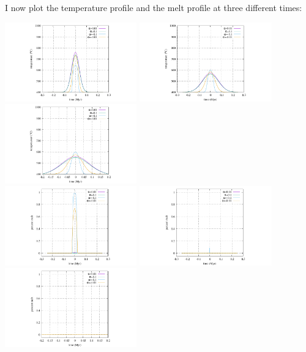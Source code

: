 I now plot the temperature profile and the melt profile at three different times:
\begin{center}
\includegraphics[width=5.7cm]{python_codes/fieldstone_169/results/nonlinear/T_10000.pdf}
\includegraphics[width=5.7cm]{python_codes/fieldstone_169/results/nonlinear/T_50000.pdf}
\includegraphics[width=5.7cm]{python_codes/fieldstone_169/results/nonlinear/T_100000.pdf}\\
\includegraphics[width=5.7cm]{python_codes/fieldstone_169/results/nonlinear/melt_10000.pdf}
\includegraphics[width=5.7cm]{python_codes/fieldstone_169/results/nonlinear/melt_50000.pdf}
\includegraphics[width=5.7cm]{python_codes/fieldstone_169/results/nonlinear/melt_100000.pdf}\\
\end{center}

